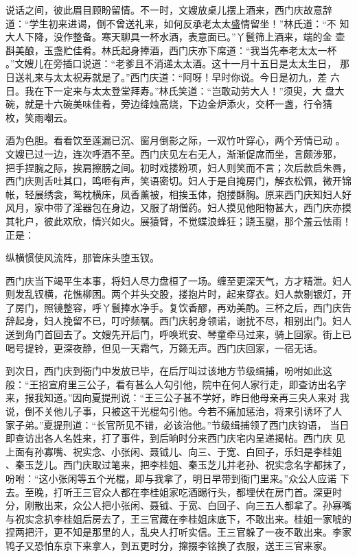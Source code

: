 说话之间，彼此眉目顾盼留情。不一时，文嫂放桌儿摆上酒来，西门庆故意辞
道：“学生初来进谒，倒不曾送礼来，如何反承老太太盛情留坐！”林氏道：“不
知大人下降，没作整备。寒天聊具一杯水酒，表意面已。”丫鬟筛上酒来，端的金
壶斟美酿，玉盏贮佳肴。林氏起身捧酒，西门庆亦下席道：“我当先奉老太太一杯
。”文嫂儿在旁插口说道：“老爹且不消递太太酒。这十一月十五日是太太生日，
那日送礼来与太太祝寿就是了。”西门庆道：“阿呀！早时你说。今日是初九，差
六日。我在下一定来与太太登堂拜寿。”林氏笑道：“岂敢动劳大人！”须臾，大
盘大碗，就是十六碗美味佳肴，旁边绛烛高烧，下边金炉添火，交杯一盏，行令猜
枚，笑雨嘲云。

酒为色胆。看看饮至莲漏已沉、窗月倒影之际，一双竹叶穿心，两个芳情已动
。文嫂已过一边，连次呼酒不至。西门庆见左右无人，渐渐促席而坐，言颇涉邪，
把手捏腕之际，挨肩擦膀之间。初时戏搂粉项，妇人则笑而不言；次后款启朱唇，
西门庆则舌吐其口，鸣咂有声，笑语密切。妇人于是自掩房门，解衣松佩，微开锦
帐，轻展绣衾，鸳枕横床，凤香薰被，相挨玉体，抱搂酥胸。原来西门庆知妇人好
风月，家中带了淫器包在身边，又服了胡僧药。妇人摸见他阳物甚大，西门庆亦摸
其牝户，彼此欢欣，情兴如火。展猿臂，不觉蝶浪蜂狂；跷玉腿，那个羞云怯雨！
正是：

纵横惯使风流阵，那管床头堕玉钗。

西门庆当下竭平生本事，将妇人尽力盘桓了一场。缠至更深天气，方才精泄。妇人
则发乱钗横，花憔柳困。两个并头交股，搂抱片时，起来穿衣。妇人款剔银灯，开
了房门，照镜整容，呼丫鬟捧水净手。复饮香醪，再劝美酌。三杯之后，西门庆告
辞起身，妇人挽留不已，叮咛频嘱。西门庆躬身领诺，谢扰不尽，相别出门。妇人
送到角门首回去了。文嫂先开后门，呼唤玳安、琴童牵马过来，骑上回家。街上已
喝号提铃，更深夜静，但见一天霜气，万籁无声。西门庆回家，一宿无话。

到次日，西门庆到衙门中发放已毕，在后厅叫过该地方节级缉捕，吩咐如此这
般：“王招宣府里三公子，看有甚么人勾引他，院中在何人家行走，即查访出名字
来，报我知道。”因向夏提刑说：“王三公子甚不学好，昨日他母亲再三央人来对
我说，倒不关他儿子事，只被这干光棍勾引他。今若不痛加惩治，将来引诱坏了人
家子弟。”夏提刑道：“长官所见不错，必该治他。”节级缉捕领了西门庆钧语，
当日即查访出各人名姓来，打了事件，到后晌时分来西门庆宅内呈递揭帖。西门庆
见上面有孙寡嘴、祝实念、小张闲、聂钺儿、向三、于宽、白回子，乐妇是李桂姐
、秦玉芝儿。西门庆取过笔来，把李桂姐、秦玉芝儿并老孙、祝实念名字都抹了，
吩咐：“这小张闲等五个光棍，即与我拿了，明日早带到衙门里来。”众公人应诺
下去。至晚，打听王三官众人都在李桂姐家吃酒踢行头，都埋伏在房门首。深更时
分，刚散出来，众公人把小张闲、聂钺、于宽、白回子、向三五人都拿了。孙寡嘴
与祝实念扒李桂姐后房去了，王三官藏在李桂姐床底下，不敢出来。桂姐一家唬的
捏两把汗，更不知是那里的人，乱央人打听实信。王三官躲了一夜不敢出来。李家
鸨子又恐怕东京下来拿人，到五更时分，撺掇李铭换了衣服，送王三官来家。


